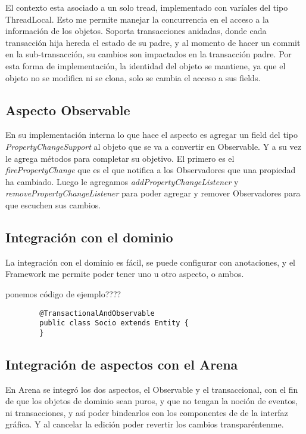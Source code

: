 	\bigskip
	
	El contexto esta asociado a un solo tread, implementado con varíales del tipo
	ThreadLocal. Esto me permite manejar la concurrencia en el acceso a la
	información de los objetos. Soporta transacciones anidadas, donde cada
	transacción hija hereda el estado de su padre, y al momento de hacer un commit
	en la sub-transacción, su cambios son impactados en la transacción padre.
	Por esta forma de implementación, la identidad del objeto se mantiene, ya que
	el objeto no se modifica ni se clona, solo se cambia el acceso a sus fields.

	\subsection{ Aspecto Observable}
			
	En su implementación interna lo que hace el aspecto es agregar un field del
	tipo \emph{PropertyChangeSupport} al objeto que se va a convertir en
	Observable. Y a su vez le agrega métodos para completar su objetivo.
	El primero es el \emph{firePropertyChange} que es el que notifica a los
	Observadores que una propiedad ha cambiado.	Luego le agregamos
	\emph{addPropertyChangeListener} y \emph{removePropertyChangeListener} para
	poder agregar y remover Observadores para que escuchen sus cambios.


\subsection{Integración con el dominio } 
	La integración con el dominio es fácil, se puede configurar con
	anotaciones, y el Framework me permite poder tener uno u otro aspecto, o
	ambos.
	
	{ponemos código de ejemplo????}
	
	\begin{lstlisting} 
		@TransactionalAndObservable
		public class Socio extends Entity {
		}
	\end{lstlisting}
	
	
	
\subsection{Integración de aspectos con el Arena}
En Arena se integró los dos aspectos, el Observable y el transaccional, con el
fin de que los objetos de dominio sean puros, y que no tengan la noción de
eventos, ni transacciones, y así poder bindearlos con los componentes de de la
interfaz gráfica. Y al cancelar la edición poder revertir los cambios
transparéntenme.


